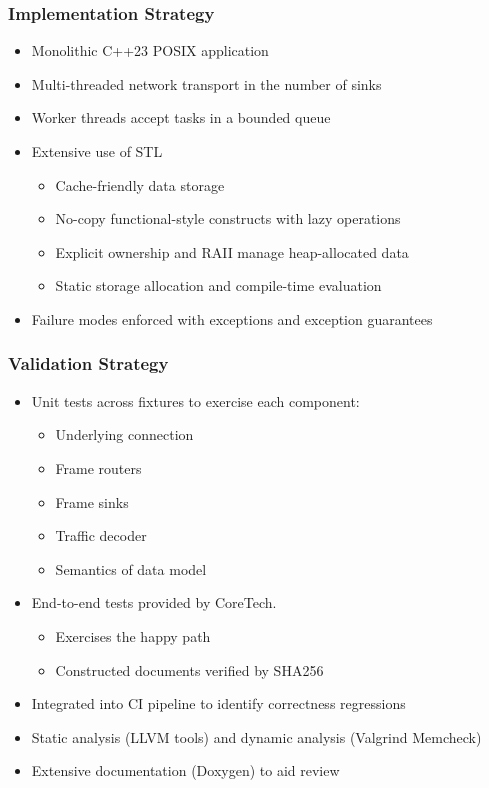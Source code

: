 \documentclass[aspectratio=169]{beamer}
\begin{document}
\begin{frame}
    \frametitle{Implementation Strategy}
    \begin{itemize}
        \item Monolithic C++23 POSIX application
        \item Multi-threaded network transport in the number of sinks
        \item Worker threads accept tasks in a bounded queue\pause
        \item Extensive use of STL
            \begin{itemize}
                \item Cache-friendly data storage
                \item No-copy functional-style constructs with lazy operations
                \item Explicit ownership and RAII manage heap-allocated data
                \item Static storage allocation and compile-time evaluation
            \end{itemize}\pause
        \item Failure modes enforced with exceptions and exception guarantees
    \end{itemize}
\end{frame}
\begin{frame}
    \frametitle{Validation Strategy}
    \begin{itemize}[<+->]
        \item Unit tests across fixtures to exercise each component:
            \begin{itemize}[<.->]
                \item Underlying connection
                \item Frame routers
                \item Frame sinks
                \item Traffic decoder
                \item Semantics of data model
            \end{itemize}
        \item End-to-end tests provided by CoreTech.
            \begin{itemize}[<.->]
                \item Exercises the happy path
                \item Constructed documents verified by SHA256
            \end{itemize}
        \item Integrated into CI pipeline to identify correctness regressions
        \item Static analysis (LLVM tools) and dynamic analysis (Valgrind Memcheck)
        \item Extensive documentation (Doxygen) to aid review
    \end{itemize}
\end{frame}
\end{document}
